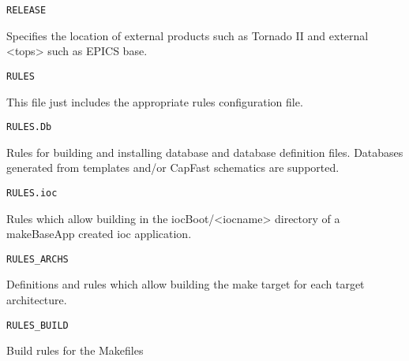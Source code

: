 \begin{description}
\end{description}\begin{verbatim}RELEASE
\end{verbatim}\begin{description}\item Specifies the location of external products such as Tornado II and external \textless{}tops\textgreater{} such as EPICS base. 

\end{description}\begin{verbatim}RULES
\end{verbatim}\begin{description}\item This file just includes the appropriate rules configuration file.

\end{description}\begin{verbatim}RULES.Db
\end{verbatim}\begin{description}\item Rules for building and installing database and database definition files. Databases generated from templates and/or 
CapFast schematics are supported.

\end{description}\begin{verbatim}RULES.ioc
\end{verbatim}\begin{description}\item Rules which allow building in the iocBoot/\textless{}iocname\textgreater{} directory of a makeBaseApp created ioc application.

\end{description}\begin{verbatim}RULES_ARCHS
\end{verbatim}\begin{description}\item Definitions and rules which allow building the make target for each target architecture.

\end{description}\begin{verbatim}RULES_BUILD
\end{verbatim}\begin{description}\item Build rules for the Makefiles 


\end{description}
